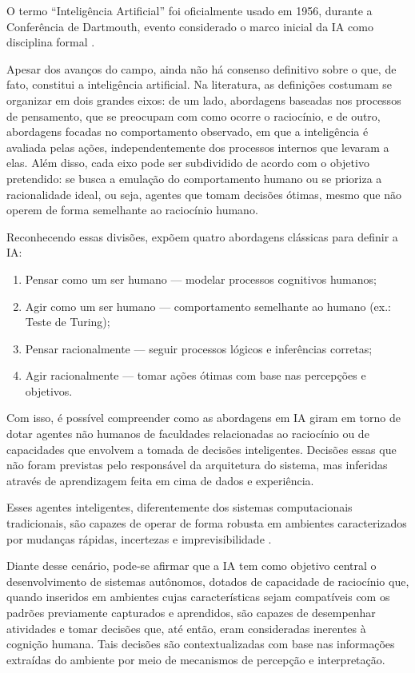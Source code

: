 O termo “Inteligência Artificial” foi oficialmente usado em 1956, durante a Conferência de Dartmouth, evento considerado o marco inicial da IA como disciplina formal \cite{mccarthy_proposal_1955}.

Apesar dos avanços do campo, ainda não há consenso definitivo sobre o que, de fato, constitui a inteligência artificial. Na literatura, as definições costumam se organizar em dois grandes eixos: de um lado, abordagens baseadas nos processos de pensamento, que se preocupam com como ocorre o raciocínio, e de outro, abordagens focadas no comportamento observado, em que a inteligência é avaliada pelas ações, independentemente dos processos internos que levaram a elas. Além disso, cada eixo pode ser subdividido de acordo com o objetivo pretendido: se busca a emulação do comportamento humano ou se prioriza a racionalidade ideal, ou seja, agentes que tomam decisões ótimas, mesmo que não operem de forma semelhante ao raciocínio humano.

Reconhecendo essas divisões,  expõem quatro abordagens clássicas para definir a IA:

\begin{enumerate}
    \item Pensar como um ser humano --- modelar processos cognitivos humanos;
    \item Agir como um ser humano --- comportamento semelhante ao humano (ex.: Teste de Turing);
    \item Pensar racionalmente --- seguir processos lógicos e inferências corretas;
    \item Agir racionalmente --- tomar ações ótimas com base nas percepções e objetivos.
\end{enumerate}

Com isso, é possível compreender como as abordagens em IA giram em torno de dotar agentes não humanos de faculdades relacionadas ao raciocínio ou de capacidades que envolvem a tomada de decisões inteligentes. Decisões essas que não foram previstas pelo responsável da arquitetura do sistema, mas inferidas através de aprendizagem feita em cima de dados e experiência.

Esses agentes inteligentes, diferentemente dos sistemas computacionais tradicionais, são capazes de operar de forma robusta em ambientes caracterizados por mudanças rápidas, incertezas e imprevisibilidade \cite{weiss_multiagent_2001}.

Diante desse cenário, pode-se afirmar que a IA tem como objetivo central o desenvolvimento de sistemas autônomos, dotados de capacidade de raciocínio que, quando inseridos em ambientes cujas características sejam compatíveis com os padrões previamente capturados e aprendidos, são capazes de desempenhar atividades e tomar decisões que, até então, eram consideradas inerentes à cognição humana. Tais decisões são contextualizadas com base nas informações extraídas do ambiente por meio de mecanismos de percepção e interpretação. 

